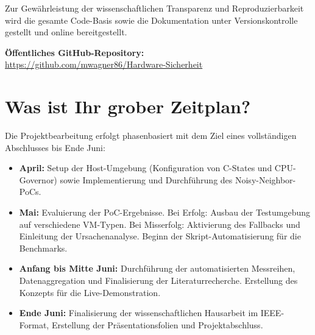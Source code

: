 \documentclass[conference]{IEEEtran}
\begin{document}
Zur Gewährleistung der wissenschaftlichen Transparenz und Reproduzierbarkeit wird die gesamte Code-Basis sowie die Dokumentation unter Versionskontrolle gestellt und online bereitgestellt.
\begin{center}
    \textbf{Öffentliches GitHub-Repository:}\\
    \url{https://github.com/mwagner86/Hardware-Sicherheit}
\end{center}

\section{Was ist Ihr grober Zeitplan?}
Die Projektbearbeitung erfolgt phasenbasiert mit dem Ziel eines vollständigen Abschlusses bis Ende Juni:
\begin{itemize}
    \item \textbf{April:} Setup der Host-Umgebung (Konfiguration von C-States und CPU-Governor) sowie Implementierung und Durchführung des Noisy-Neighbor-PoCs.
    \item \textbf{Mai:} Evaluierung der PoC-Ergebnisse. Bei Erfolg: Ausbau der Testumgebung auf verschiedene VM-Typen. Bei Misserfolg: Aktivierung des Fallbacks und Einleitung der Ursachenanalyse. Beginn der Skript-Automatisierung für die Benchmarks.
    \item \textbf{Anfang bis Mitte Juni:} Durchführung der automatisierten Messreihen, Datenaggregation und Finalisierung der Literaturrecherche. Erstellung des Konzepts für die Live-Demonstration.
    \item \textbf{Ende Juni:} Finalisierung der wissenschaftlichen Hausarbeit im IEEE-Format, Erstellung der Präsentationsfolien und Projektabschluss.
\end{itemize}



\end{document}

